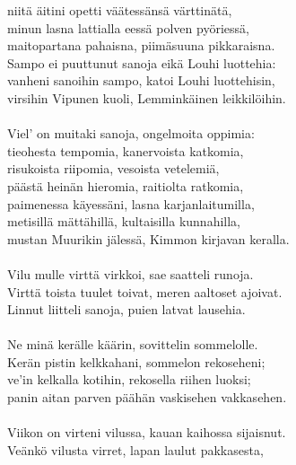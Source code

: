 niitä äitini opetti väätessänsä värttinätä,                 \\
minun lasna lattialla eessä polven pyöriessä,               \\
maitopartana pahaisna, piimäsuuna pikkaraisna.              \\
Sampo ei puuttunut sanoja eikä Louhi luottehia:             \\
vanheni sanoihin sampo, katoi Louhi luottehisin,            \\
virsihin Vipunen kuoli, Lemminkäinen leikkilöihin.          \\
                                                            \\
Viel' on muitaki sanoja, ongelmoita oppimia:                \\
tieohesta tempomia, kanervoista katkomia,                   \\
risukoista riipomia, vesoista vetelemiä,                    \\
päästä heinän hieromia, raitiolta ratkomia,                 \\
paimenessa käyessäni, lasna karjanlaitumilla,               \\
metisillä mättähillä, kultaisilla kunnahilla,               \\
mustan Muurikin jälessä, Kimmon kirjavan keralla.           \\
                                                            \\
Vilu mulle virttä virkkoi, sae saatteli runoja.             \\
Virttä toista tuulet toivat, meren aaltoset ajoivat.        \\
Linnut liitteli sanoja, puien latvat lausehia.              \\
                                                            \\
Ne minä kerälle käärin, sovittelin sommelolle.              \\
Kerän pistin kelkkahani, sommelon rekoseheni;               \\
ve'in kelkalla kotihin, rekosella riihen luoksi;            \\
panin aitan parven päähän vaskisehen vakkasehen.            \\
                                                            \\
Viikon on virteni vilussa, kauan kaihossa sijaisnut.        \\
Veänkö vilusta virret, lapan laulut pakkasesta,             \\
